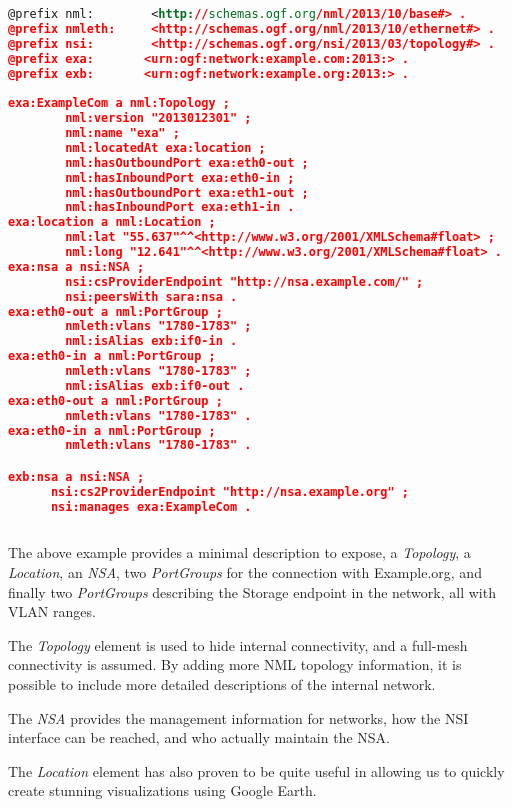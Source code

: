\documentclass[12pt]{article}  %
\begin{document}
\begin{lstlisting}[language=XML]
@prefix nml:        <http://schemas.ogf.org/nml/2013/10/base#> .
@prefix nmleth:     <http://schemas.ogf.org/nml/2013/10/ethernet#> .
@prefix nsi:        <http://schemas.ogf.org/nsi/2013/03/topology#> .
@prefix exa:       <urn:ogf:network:example.com:2013:> .
@prefix exb:       <urn:ogf:network:example.org:2013:> .
  
exa:ExampleCom a nml:Topology ;
        nml:version "2013012301" ;
        nml:name "exa" ;
        nml:locatedAt exa:location ;
        nml:hasOutboundPort exa:eth0-out ;
        nml:hasInboundPort exa:eth0-in ;
        nml:hasOutboundPort exa:eth1-out ;
        nml:hasInboundPort exa:eth1-in .
exa:location a nml:Location ;
        nml:lat "55.637"^^<http://www.w3.org/2001/XMLSchema#float> ;
        nml:long "12.641"^^<http://www.w3.org/2001/XMLSchema#float> .
exa:nsa a nsi:NSA ;
        nsi:csProviderEndpoint "http://nsa.example.com/" ;
        nsi:peersWith sara:nsa .
exa:eth0-out a nml:PortGroup ;
        nmleth:vlans "1780-1783" ;
        nml:isAlias exb:if0-in .
exa:eth0-in a nml:PortGroup ;
        nmleth:vlans "1780-1783" ;
        nml:isAlias exb:if0-out .
exa:eth0-out a nml:PortGroup ;
        nmleth:vlans "1780-1783" .
exa:eth0-in a nml:PortGroup ;
        nmleth:vlans "1780-1783" .

exb:nsa a nsi:NSA ;
      nsi:cs2ProviderEndpoint "http://nsa.example.org" ;
      nsi:manages exa:ExampleCom .
      
\end{lstlisting}



 The above example provides a minimal description to expose, 
a \emph{Topology}, a \emph{Location}, an \emph{NSA}, two \emph{PortGroups} for the connection with Example.org, 
and finally two \emph{PortGroups} describing the Storage endpoint in the network, all 
with VLAN ranges.

 The \emph{Topology} element is used to hide internal connectivity, and 
a full-mesh connectivity is assumed. By adding more NML topology information, it is possible 
to include more detailed descriptions of the internal network.


 The \emph{NSA} provides the management information for networks, how 
the NSI interface can be reached, and who actually maintain the NSA.

 The \emph{Location} element has also proven to be quite useful in allowing 
us to quickly create stunning visualizations using Google Earth.
\end{document}
